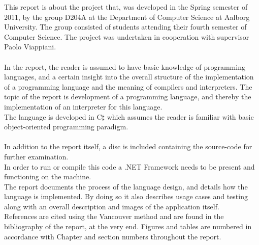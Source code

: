 This report is about the project that, was developed in the Spring semester of 2011, by the group D204A at the Department of Computer Science at Aalborg University. The group consisted of students attending their fourth semester of Computer Science. The project was undertaken in cooperation with supervisor Paolo Viappiani. \\
\\
In the report, the reader is assumed to have basic knowledge of programming languages, and a certain insight into the overall structure of the implementation of a programming language and the meaning of compilers and interpreters. The topic of the report is development of a programming language, and thereby the implementation of an interpreter for this language. \\
The language is developed in C$\sharp$ which assumes the reader is familiar with basic object-oriented programming paradigm. \\
\\
In addition to the report itself, a disc is included containing the source-code for further examination. \\
In order to run or compile this code a .NET Framework needs to be present and functioning on the machine. \\

The report documents the process of the language design, and details how the language is implemented. By doing so it also describes usage cases and testing along with an overall description and images of the application itself. \\

References are cited using the Vancouver method and are found in the bibliography of the report, at the very end. 
Figures and tables are numbered in accordance with Chapter and section numbers throughout the report.

\newpage\mbox{}\newpage